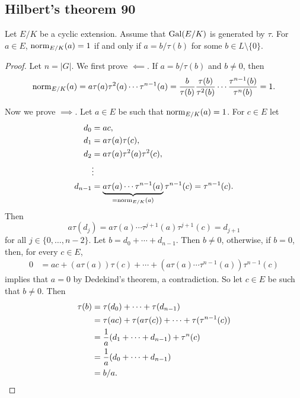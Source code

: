 \subsection{Hilbert's theorem 90}

\begin{theorem}[Hilbert]
    Let $E/K$ be a cyclic extension. Assume that 
    $\operatorname{Gal}(E/K)$ is generated by $\tau$. For 
    $a\in E$, $\operatorname{norm}_{E/K}(a)=1$ if and only 
    if $a=b/\tau(b)$ for some $b\in L\setminus\{0\}$. 
\end{theorem}

\begin{proof}
    Let $n=|G|$. We first prove $\impliedby$. If $a=b/\tau(b)$ and $b\ne 0$, then 
    \[
    \operatorname{norm}_{E/K}(a)=a\tau(a)\tau^2(a)\cdots\tau^{n-1}(a)
    =\frac{b}{\tau(b)}\frac{\tau(b)}{\tau^2(b)}\cdots\frac{\tau^{n-1}(b)}{\tau^n(b)}=1.
    \]

    Now we prove $\implies$. Let $a\in E$ be such that $\operatorname{norm}_{E/K}(a)=1$. For 
    $c\in E$ let 
    \begin{align*}
        d_0 &= ac,\\
        d_1 &= a\tau(a)\tau(c),\\
        d_2 &= a\tau(a)\tau^2(a)\tau^2(c),\\
        &\vdots\\
        d_{n-1} &= \underbrace{a\tau(a)\cdots\tau^{n-1}(a)}_{=\operatorname{norm}_{E/K}(a)}\tau^{n-1}(c)=\tau^{n-1}(c).
    \end{align*}
    Then 
    \[
    a\tau(d_j)=a\tau(a)\cdots\tau^{j+1}(a)\tau^{j+1}(c)=d_{j+1}
    \]
    for all $j\in\{0,\dots,n-2\}$. Let $b=d_0+\cdots+d_{n-1}$. Then 
    $b\ne 0$, otherwise, if $b=0$, then, for every $c\in E$, 
    \begin{align*}
    0&=ac+(a\tau(a))\tau(c)+\cdots+(a\tau(a)\cdots\tau^{n-1}(a))\tau^{n-1}(c)
    \end{align*}
    implies that $a=0$ by Dedekind's theorem, a contradiction. So let $c\in E$ be
    such that $b\ne 0$. Then 
    \begin{align*}
    \tau(b)&=\tau(d_0)+\cdots+\tau(d_{n-1})\\
    &=\tau(ac)+\tau(a\tau(c))+\cdots+\tau(\tau^{n-1}(c))\\
    &=\frac{1}{a}(d_1+\cdots+d_{n-1})+\tau^n(c)\\
    &=\frac{1}{a}(d_0+\cdots+d_{n-1})\\
    &=b/a.\qedhere
    \end{align*}
\end{proof}

